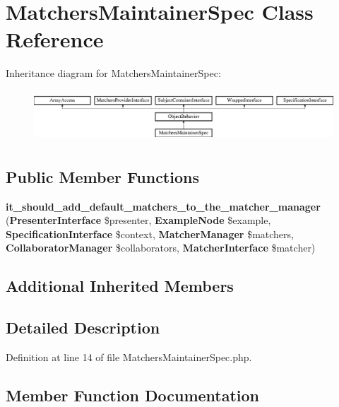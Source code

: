 \section{Matchers\+Maintainer\+Spec Class Reference}
\label{classspec_1_1_php_spec_1_1_runner_1_1_maintainer_1_1_matchers_maintainer_spec}
Inheritance diagram for Matchers\+Maintainer\+Spec\+:\begin{figure}[H]
\begin{center}
\leavevmode
\includegraphics[height=1.953488cm]{classspec_1_1_php_spec_1_1_runner_1_1_maintainer_1_1_matchers_maintainer_spec}
\end{center}
\end{figure}
\subsection*{Public Member Functions}
\begin{DoxyCompactItemize}
\item 
{\bf it\+\_\+should\+\_\+add\+\_\+default\+\_\+matchers\+\_\+to\+\_\+the\+\_\+matcher\+\_\+manager} ({\bf Presenter\+Interface} \$presenter, {\bf Example\+Node} \$example, {\bf Specification\+Interface} \$context, {\bf Matcher\+Manager} \$matchers, {\bf Collaborator\+Manager} \$collaborators, {\bf Matcher\+Interface} \$matcher)
\end{DoxyCompactItemize}
\subsection*{Additional Inherited Members}


\subsection{Detailed Description}


Definition at line 14 of file Matchers\+Maintainer\+Spec.\+php.



\subsection{Member Function Documentation}
